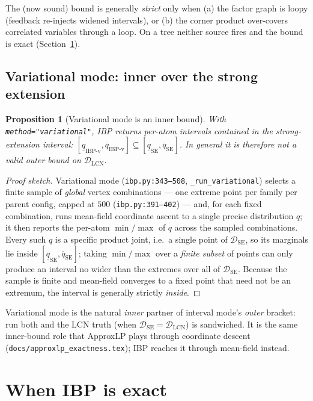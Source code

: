 \documentclass[11pt]{article}
\newtheorem{proposition}{Proposition}
\newcommand{\lo}{\underline}
\newcommand{\hi}{\overline}
\newcommand{\DSE}{\mathcal{D}_{\mathrm{SE}}}
\newcommand{\DLCN}{\mathcal{D}_{\mathrm{LCN}}}
\begin{document}
\medskip\noindent The (now sound) bound is generally \emph{strict} only when (a) the factor graph is
loopy (feedback re-injects widened intervals), or (b) the corner product over-covers correlated
variables through a loop. On a tree neither source fires and the bound is exact
(Section~\ref{sec:exact}).

\subsection{Variational mode: inner over the strong extension}

\begin{proposition}[Variational mode is an inner bound]\label{prop:inner}
With \texttt{method="variational"}, IBP returns per-atom intervals \emph{contained in} the
strong-extension interval: $[\lo q_{\mathrm{IBP\text{-}v}},\hi
q_{\mathrm{IBP\text{-}v}}]\subseteq[\lo q_{\mathrm{SE}},\hi q_{\mathrm{SE}}]$. In general it is
therefore \emph{not} a valid outer bound on $\DLCN$.
\end{proposition}

\begin{proof}[Proof sketch]
Variational mode (\texttt{ibp.py:343--508}, \texttt{\_run\_variational}) selects a finite sample of
\emph{global} vertex combinations --- one extreme point per family per parent config, capped at $500$
(\texttt{ibp.py:391--402}) --- and, for each fixed combination, runs mean-field coordinate ascent to a
single precise distribution $q$; it then reports the per-atom $\min/\max$ of $q$ across the sampled
combinations. Every such $q$ is a specific product joint, i.e.\ a single point of $\DSE$, so its
marginals lie inside $[\lo q_{\mathrm{SE}},\hi q_{\mathrm{SE}}]$; taking $\min/\max$ over a
\emph{finite subset} of points can only produce an interval no wider than the extremes over all of
$\DSE$. Because the sample is finite and mean-field converges to a fixed point that need not be an
extremum, the interval is generally strictly \emph{inside}.
\end{proof}

\noindent Variational mode is the natural \emph{inner} partner of interval mode's \emph{outer}
bracket: run both and the LCN truth (when $\DSE=\DLCN$) is sandwiched. It is the same inner-bound
role that ApproxLP plays through coordinate descent (\texttt{docs/approxlp\_exactness.tex}); IBP
reaches it through mean-field instead.

\section{When IBP is exact}\label{sec:exact}
\end{document}
